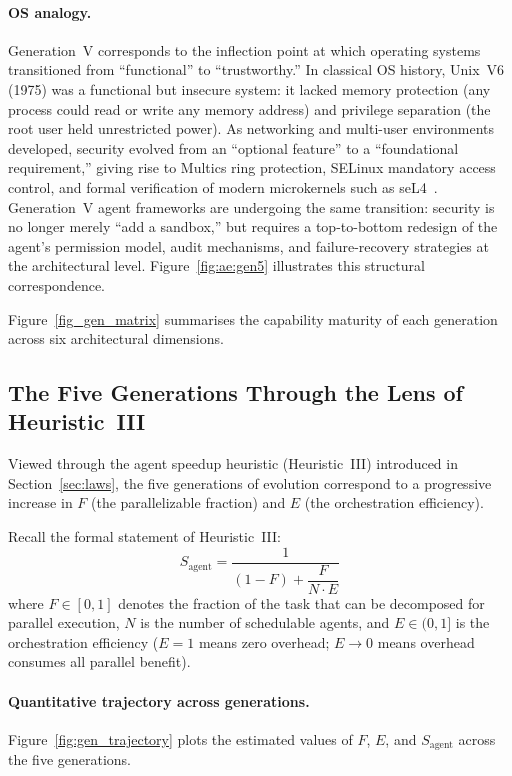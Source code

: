 \paragraph{OS analogy.}
Generation~V corresponds to the inflection point at which operating systems transitioned from ``functional'' to ``trustworthy.''
In classical OS history, Unix~V6 (1975) was a functional but insecure system: it lacked memory protection (any process could read or write any memory address) and privilege separation (the root user held unrestricted power).
As networking and multi-user environments developed, security evolved from an ``optional feature'' to a ``foundational requirement,'' giving rise to Multics ring protection, SELinux mandatory access control, and formal verification of modern microkernels such as seL4~\cite{ostep_2023}.
Generation~V agent frameworks are undergoing the same transition: security is no longer merely ``add a sandbox,'' but requires a top-to-bottom redesign of the agent's permission model, audit mechanisms, and failure-recovery strategies at the architectural level.
Figure~\ref{fig:ae:gen5} illustrates this structural correspondence.


Figure~\ref{fig_gen_matrix} summarises the capability maturity of each generation across six architectural dimensions.


\subsection{The Five Generations Through the Lens of Heuristic~III}

Viewed through the agent speedup heuristic (Heuristic~III) introduced in Section~\ref{sec:laws}, the five generations of evolution correspond to a progressive increase in $F$ (the parallelizable fraction) and $E$ (the orchestration efficiency).

Recall the formal statement of Heuristic~III:
\begin{equation}
\label{eq:agent_law_review}
S_{\mathrm{agent}} = \frac{1}{(1-F) + \dfrac{F}{N \cdot E}}
\end{equation}
where $F \in [0,1]$ denotes the fraction of the task that can be decomposed for parallel execution, $N$ is the number of schedulable agents, and $E \in (0,1]$ is the orchestration efficiency ($E=1$ means zero overhead; $E\to 0$ means overhead consumes all parallel benefit).

\paragraph{Quantitative trajectory across generations.}
Figure~\ref{fig:gen_trajectory} plots the estimated values of $F$, $E$, and $S_{\mathrm{agent}}$ across the five generations.

